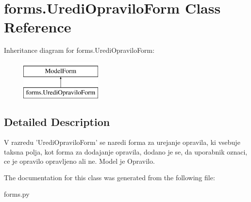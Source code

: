 \section{forms.\+Uredi\+Opravilo\+Form Class Reference}
\label{classforms_1_1_uredi_opravilo_form}
Inheritance diagram for forms.\+Uredi\+Opravilo\+Form\+:\begin{figure}[H]
\begin{center}
\leavevmode
\includegraphics[height=2.000000cm]{classforms_1_1_uredi_opravilo_form}
\end{center}
\end{figure}


\subsection{Detailed Description}
\begin{DoxyVerb}    V razredu 'UrediOpraviloForm' se naredi forma za urejanje opravila, ki vsebuje taksna polja, kot forma za dodajanje opravila, dodano je se, da uporabnik oznaci, ce je opravilo opravljeno ali ne.
    Model je Opravilo.
\end{DoxyVerb}
 

The documentation for this class was generated from the following file\+:\begin{DoxyCompactItemize}
\item 
forms.\+py\end{DoxyCompactItemize}
